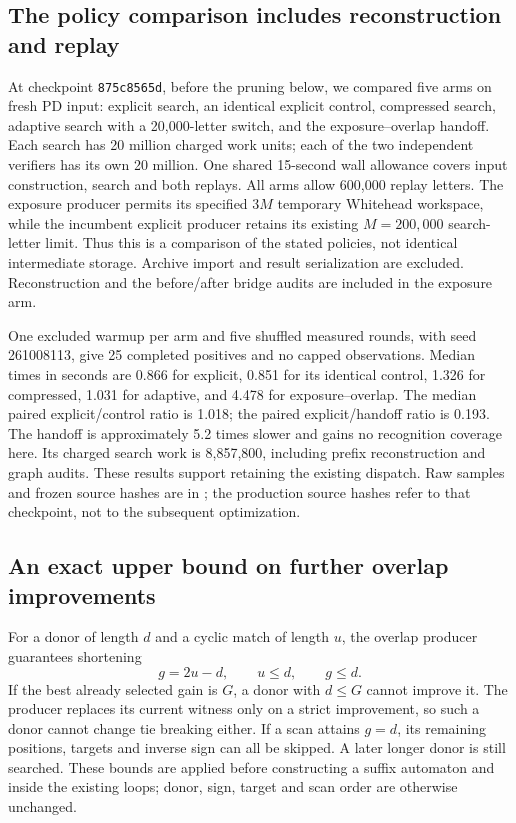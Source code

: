 \subsection{The policy comparison includes reconstruction and replay}

At checkpoint \texttt{875c8565d}, before the pruning below, we compared five
arms on fresh PD input: explicit search, an identical explicit control,
compressed search, adaptive search with a 20,000-letter switch, and the
exposure--overlap handoff. Each search has 20 million charged work units;
each of the two independent verifiers has its own 20 million. One shared
15-second wall allowance covers input construction, search and both replays.
All arms allow 600,000 replay letters. The exposure producer permits its
specified $3M$ temporary Whitehead workspace, while the incumbent explicit
producer retains its existing $M=200,000$ search-letter limit. Thus this is
a comparison of the stated policies, not identical intermediate storage.
Archive import and result serialization are excluded. Reconstruction and
the before/after bridge audits are included in the exposure arm.

One excluded warmup per arm and five shuffled measured rounds, with seed
261008113, give 25 completed positives and no capped observations. Median
times in seconds are 0.866 for explicit, 0.851 for its identical control,
1.326 for compressed, 1.031 for adaptive, and 4.478 for exposure--overlap.
The median paired explicit/control ratio is 1.018; the paired explicit/handoff
ratio is 0.193. The handoff is approximately 5.2 times slower and gains no
recognition coverage here. Its charged search work is 8,857,800, including
prefix reconstruction and graph audits. These results support retaining the
existing dispatch. Raw samples and frozen source hashes are in
; the production source
hashes refer to that checkpoint, not to the subsequent optimization.

\subsection{An exact upper bound on further overlap improvements}

For a donor of length $d$ and a cyclic match of length $u$, the overlap
producer guarantees shortening
\[
 g=2u-d,\qquad u\le d,\qquad g\le d.
\]
If the best already selected gain is $G$, a donor with $d\le G$ cannot
improve it. The producer replaces its current witness only on a strict
improvement, so such a donor cannot change tie breaking either. If a scan
attains $g=d$, its remaining positions, targets and inverse sign can all be
skipped. A later longer donor is still searched. These bounds are applied
before constructing a suffix automaton and inside the existing loops;
donor, sign, target and scan order are otherwise unchanged.

